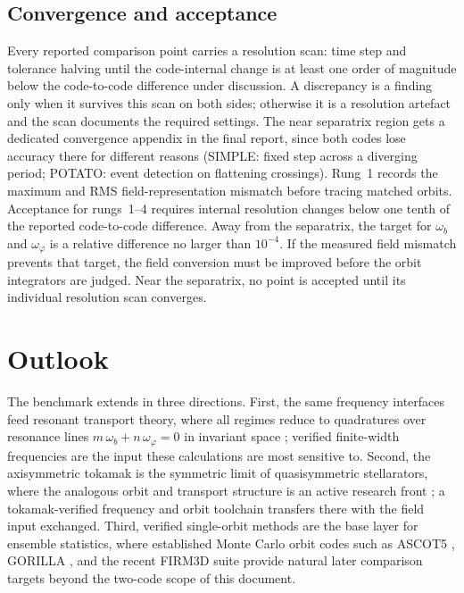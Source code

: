 \documentclass[11pt,a4paper]{article}
\begin{document}
\subsection{Convergence and acceptance}

Every reported comparison point carries a resolution scan: time step and
tolerance halving until the code-internal change is at least one order of
magnitude below the code-to-code difference under discussion. A discrepancy
is a finding only when it survives this scan on both sides; otherwise it is a
resolution artefact and the scan documents the required settings. The near
separatrix region gets a dedicated convergence appendix in the final report,
since both codes lose accuracy there for different reasons (SIMPLE: fixed
step across a diverging period; POTATO: event detection on flattening
crossings). Rung~1 records the maximum and RMS field-representation mismatch
before tracing matched orbits. Acceptance for rungs~1--4 requires internal
resolution changes below one tenth of the reported code-to-code difference.
Away from the separatrix, the target for $\omega_b$ and $\omega_\varphi$ is a
relative difference no larger than $10^{-4}$. If the measured field mismatch
prevents that target, the field conversion must be improved before the orbit
integrators are judged. Near the separatrix, no point is accepted until its
individual resolution scan converges.

\section{Outlook}
\label{sec:outlook}

The benchmark extends in three directions. First, the same
frequency interfaces feed resonant transport theory, where all regimes reduce
to quadratures over resonance lines $m\,\omega_b + n\,\omega_\varphi = 0$ in
invariant space \citep{albert2016,buchholz2022}; verified finite-width
frequencies are the input these calculations are most sensitive to. Second,
the axisymmetric tokamak is the symmetric limit of quasisymmetric
stellarators, where the analogous orbit and transport structure is an active
research front \citep{catto2023,foster2025,chambliss2024}; a tokamak-verified
frequency and orbit toolchain transfers there with the field input exchanged.
Third, verified single-orbit methods are the base layer for ensemble
statistics, where established Monte Carlo orbit codes such as ASCOT5
\citep{varje2019}, GORILLA \citep{eder2020}, and the recent FIRM3D suite
\citep{paul2026} provide natural later comparison targets beyond the
two-code scope of this document.



\end{document}
